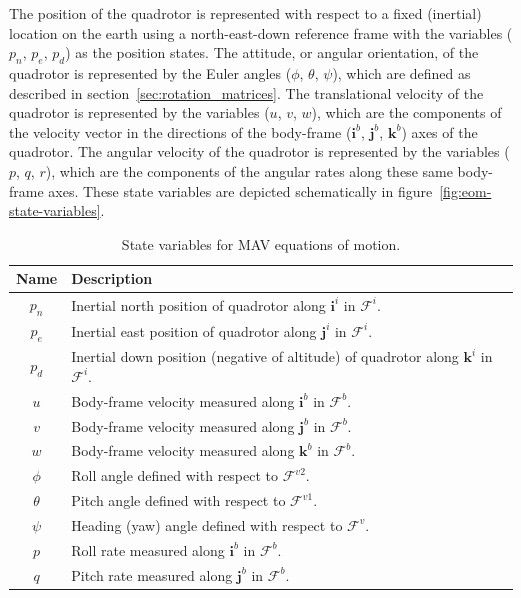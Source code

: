 {The position of the quadrotor is represented with respect to a fixed (inertial) location on the earth using a north-east-down reference frame with the variables ($p_n$, $p_e$, $p_d$) as the position states. The attitude, or angular orientation, of the quadrotor is represented by the Euler angles ($\phi$, $\theta$, $\psi$), which are defined as described in section~\ref{sec:rotation_matrices}. The translational velocity of the quadrotor is represented by the variables ($u$, $v$, $w$), which are the components of the velocity vector in the directions of the body-frame ($\mathbf{i}^b$, $\mathbf{j}^b$, $\mathbf{k}^b$) axes of the quadrotor. The angular velocity of the quadrotor is represented by the variables ($p$, $q$, $r$), which are the components of the angular rates along these same body-frame axes. These state variables are depicted schematically in figure~\ref{fig:eom-state-variables}.
%
\begin{table}
\centering
\caption{State variables for MAV equations of motion.}
\label{tab:eom-state-variables}
\vspace{0.07in}
\begin{tabular}{|c|l|}
\hline
Name & Description \\
\hline \hline
$p_n$ & Inertial north position of quadrotor along $\mathbf{i}^i$ in $\mathcal{F}^i$.\\  \hline
$p_e$ & Inertial east position of quadrotor along $\mathbf{j}^i$ in $\mathcal{F}^i$.\\  \hline
$p_d$ & Inertial down position (negative of altitude) of quadrotor along $\mathbf{k}^i$ in $\mathcal{F}^i$.\\  \hline
$u$ & Body-frame velocity measured along $\mathbf{i}^b$ in $\mathcal{F}^b$.\\  \hline
$v$ & Body-frame velocity measured along $\mathbf{j}^b$ in $\mathcal{F}^b$.\\  \hline
$w$ & Body-frame velocity measured along $\mathbf{k}^b$ in $\mathcal{F}^b$.\\  \hline
$\phi$ & Roll angle defined with respect to $\mathcal{F}^{v2}$.\\  \hline
$\theta$ & Pitch angle defined with respect to $\mathcal{F}^{v1}$.\\  \hline
$\psi$ & Heading (yaw) angle defined with respect to $\mathcal{F}^v$. \\  \hline
$p$ & Roll rate measured along $\mathbf{i}^b$ in $\mathcal{F}^b$. \\  \hline
$q$ & Pitch rate measured along $\mathbf{j}^b$ in $\mathcal{F}^b$. \\  \hline

\end{tabular}
\end{table}}

